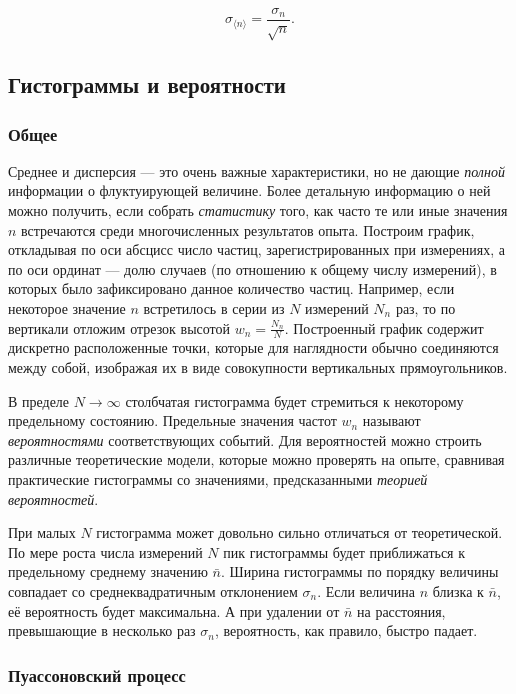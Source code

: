 \documentclass[12pt, a4paper]{article}
\begin{document}
\[\sigma_{\langle n \rangle} = \frac{\sigma_n}{\sqrt{n}}.\]


\subsection{Гистограммы и вероятности}

\subsubsection*{Общее}

Среднее и дисперсия — это очень важные характеристики,
но не дающие \textit{полной} информации о флуктуирующей величине.
Более детальную информацию о ней можно получить, если собрать
\textit{статистику} того, как часто те или иные значения $n$ встречаются среди
многочисленных результатов опыта. Построим график, откладывая по оси абсцисс
число частиц, зарегистрированных при измерениях, а по оси ординат — долю
случаев (по отношению к общему числу измерений), в которых было зафиксировано
данное количество частиц. Например, если некоторое значение $n$ встретилось в
серии из $N$ измерений $N_n$ раз, то по вертикали отложим отрезок
высотой $w_n = \frac{N_n}{N}$. Построенный график содержит дискретно
расположенные точки, которые для наглядности обычно соединяются между собой,
изображая их в виде совокупности вертикальных прямоугольников.


В пределе $N\to\infty$ столбчатая гистограмма будет стремиться к некоторому
предельному состоянию. Предельные значения частот $w_n$ называют
\textit{вероятностями} соответствующих событий. Для вероятностей можно
строить различные теоретические модели, которые можно проверять на опыте,
сравнивая практические гистограммы со значениями, предсказанными
\textit{теорией вероятностей}.


При малых $N$ гистограмма может довольно сильно отличаться от теоретической.
По мере роста числа измерений $N$ пик гистограммы будет приближаться
к предельному среднему значению $\bar{n}$. Ширина гистограммы по порядку
величины совпадает со среднеквадратичным отклонением $\sigma_n$.
Если величина $n$ близка к $\bar{n}$, её вероятность будет максимальна.
А при удалении от $\bar{n}$ на расстояния, превышающие в несколько раз
$\sigma_n$, вероятность, как правило, быстро падает.


\subsubsection*{Пуассоновский процесс}
\end{document}
